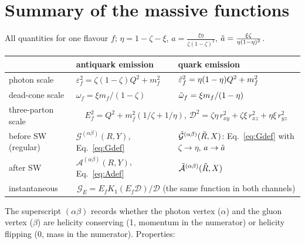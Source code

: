 \documentclass[9pt]{article}
\newcommand{\eps}{\varepsilon_{f}}           %
\newcommand{\epsq}{\Tilde{\varepsilon}_{f}}  %
\newcommand{\om}{\omega_{f}}                 %
\newcommand{\omq}{\Tilde{\omega}_{f}}        %
\newcommand{\Ef}{E_{f}}                      %
\newcommand{\G}[1]{\mathcal{G}^{(#1)}}       %
\newcommand{\Ga}[1]{\mathcal{A}^{(#1)}}      %
\newcommand{\Gq}[1]{\Tilde{\mathcal{G}}^{(#1)}}
\newcommand{\Gaq}[1]{\Tilde{\mathcal{A}}^{(#1)}}
\newcommand{\GE}{\mathcal{G}_{E}}            %
\numberwithin{equation}{section}
\begin{document}
\section{Summary of the massive functions}\label{app:functions}
All quantities for one flavour $f$; $\eta=1-\zeta-\xi$, $a=\frac{\xi\eta}{\zeta(1-\zeta)^{2}}$, $\Tilde{a}=\frac{\xi\zeta}{\eta(1-\eta)^{2}}$.
\begin{center}
\begin{tabular}{||l|l|l||}
\hline
 & antiquark emission & quark emission \\
\hline\hline
photon scale & $\eps^{2}=\zeta(1-\zeta)Q^{2}+m^{2}_{f}$ & $\epsq^{2}=\eta(1-\eta)Q^{2}+m^{2}_{f}$ \\
dead-cone scale & $\om=\xi m_{f}/(1-\zeta)$ & $\omq=\xi m_{f}/(1-\eta)$ \\
three-parton scale & \multicolumn{2}{c||}{$\Ef^{2}=Q^{2}+m^{2}_{f}(1/\zeta+1/\eta)$, \quad $\mathcal{D}^{2}=\zeta\eta\,r^{2}_{xy}+\zeta\xi\,r^{2}_{xz}+\eta\xi\,r^{2}_{yz}$} \\
before SW (regular) & $\G{\alpha\beta}(R,Y)$, Eq.~\eqref{eq:Gdef} & $\Gq{\alpha\beta}(\Tilde{R},X)$: Eq.~\eqref{eq:Gdef} with $\zeta\rightarrow\eta$, $a\rightarrow\Tilde{a}$ \\
after SW & $\Ga{\alpha\beta}(R,Y)$, Eq.~\eqref{eq:Adef} & $\Gaq{\alpha\beta}(\Tilde{R},X)$ \\
instantaneous & \multicolumn{2}{c||}{$\GE=\Ef K_{1}(\Ef\mathcal{D})/\mathcal{D}$ (the same function in both channels)} \\
\hline
\end{tabular}
\end{center}
The superscript $(\alpha\beta)$ records whether the photon vertex ($\alpha$) and the gluon vertex ($\beta$) are helicity conserving (1, momentum in the numerator) or helicity flipping (0, mass in the numerator). Properties:
\end{document}
